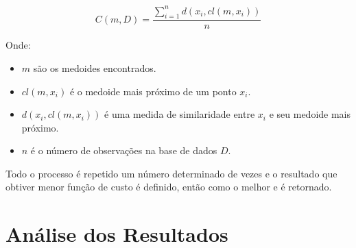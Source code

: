 \documentclass[12pt,a4paper,header]{abnt}
\begin{document}
\begin{equation}
C(m, D) = \frac{\sum_{i=1}^{n}{d(x_i, cl(m, x_i))}}{n}
\end{equation}

Onde:

\begin{itemize}

\item{$m$ são os medoides encontrados.}
\item{$cl(m,  x_i)$ é o medoide mais próximo de um ponto $x_i$.}
\item{$d(x_i, cl(m, x_i))$ é uma medida de similaridade entre $x_i$ e seu medoide mais próximo.}
\item{$n$ é o número de observações na base de dados $D$.}

\end{itemize}

Todo o processo é repetido um número determinado de vezes e o resultado que obtiver menor função de custo é definido, então como o melhor e é retornado\cite{bhat2014k}.


% 
% 
% 
% 
% 
% 
% 
% 


\chapter{Análise dos Resultados}
\end{document}

